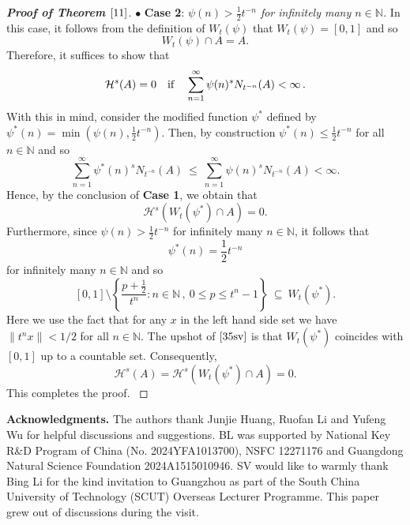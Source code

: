 \documentclass[12pt]{article}
\theoremstyle{definition}
\theoremstyle{remark}
\begin{document}
\begin{proof}[\rm \textbf{Proof of Theorem $\ref{11}$}]
\noindent $\bullet$ \textbf{Case 2}: \textit{$\psi(n)>\frac{1}{2}t^{-n}$ for infinitely many $n\in\mathbb{N}$.}
 In this case, it follows from  the definition of $W_{t}(\psi)$ that $W_{t}(\psi)=[0,1]$ and so  $$W_{t}(\psi)\cap A=A.$$ Therefore, it suffices to show that 
$$\mathcal{H}^{s}(A)=0  \quad   {\rm if }  \quad  \sum\limits_{n=1}^{\infty}\psi(n)^{s}N_{t^{-n}}(A)  < \infty \, .   $$
 With this in mind, consider the modified function $\psi^*$ defined  by  $\psi^{*}(n)=\min(\psi(n),\frac{1}{2}t^{-n})$.  Then,  by construction $\psi^{*}(n)\leq\frac{1}{2}t^{-n}$ for all $n\in\mathbb{N}$  and so 
$$\sum\limits_{n=1}^{\infty}\psi^{*}(n)^{s}N_{t^{-n}}(A) \ \leq \ \sum\limits_{n=1}^{\infty}\psi(n)^{s}N_{t^{-n}}(A)<\infty.$$
Hence, by the conclusion of \textbf{Case 1}, we obtain that
$$\mathcal{H}^{s}(W_{t}(\psi^{*})\cap A)=0.$$
Furthermore, since $\psi(n)>\frac{1}{2}t^{-n}$ for infinitely many $n\in\mathbb{N}$, it follows that
$$\psi^{*}(n)=\frac{1}{2}t^{-n}$$
for infinitely many $n\in\mathbb{N}$ and so  
\begin{equation}\label{35sv}
 [0,1]\setminus\left\{\frac{p+\frac{1}{2}}{t^{n}}:n\in\mathbb{N} \, , \ 0\leq p\leq t^{n}-1\right\} \ \subseteq  \ W_{t}(\psi^{*}).   
\end{equation}
Here we use the fact that for any $x$ in the left  hand side set we have $\|t^{n}x\|< 1/2 
$ for all $n\in\mathbb{N}$. The upshot of $\eqref{35sv}$ is that $W_{t}(\psi^{*}) $ coincides with $[0,1]$ up to a countable set.  Consequently,    
$$\mathcal{H}^{s}(A)=\mathcal{H}^{s}(W_{t}(\psi^{*})\cap A)=0.$$
This completes the proof.
\textrm{}
\end{proof}
  
 
    
 

 



\noindent \textbf{Acknowledgments.} The authors thank Junjie Huang, Ruofan Li and Yufeng Wu for helpful discussions and suggestions. BL was supported by National Key R\&D Program of China (No. 2024YFA1013700), NSFC 12271176 and Guangdong Natural Science Foundation 2024A1515010946.
SV would like to warmly thank Bing Li for the kind invitation to Guangzhou as part of the South China University of Technology (SCUT) Overseas Lecturer Programme. This paper grew out of discussions during the visit.
\end{document}
